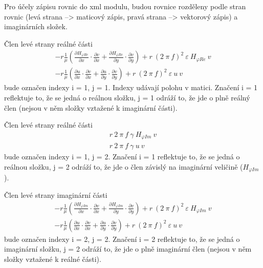 \documentclass[12pt,a4paper,oneside]{article}
\numberwithin{equation}{section} %
\numberwithin{figure}{section} %
\numberwithin{table}{section} %
\begin{document}
Pro účely zápisu rovnic do xml modulu, budou rovnice rozděleny podle stran rovnic (levá strana --> maticový zápis, pravá strana --> vektorový zápis) a imaginárních složek.

Člen levé strany reálné části
\begin{subequations}
\begin{gather}
- r \frac{1}{\mu} \left( \frac{\partial H _{\varphi Re}}{\partial x} \cdot \frac{\partial v}{\partial x} + \frac{\partial H _{\varphi Re}}{\partial y} \cdot \frac{\partial v}{\partial y} \right) + r ~ (2 ~ \pi ~ f) ^2 ~ \varepsilon ~ H _{\varphi Re} ~ v
\\
- r \frac{1}{\mu} \left( \frac{\partial u}{\partial x} \cdot \frac{\partial v}{\partial x} + \frac{\partial u}{\partial y} \cdot \frac{\partial v}{\partial y} \right) + r ~ (2 ~ \pi ~ f) ^2  ~ \varepsilon ~ u ~ v
\end{gather}
\end{subequations}
bude označen indexy i = 1, j = 1. Indexy udávají polohu v matici. Značení i = 1 reflektuje to, že se jedná o reálnou složku, j = 1 odráží to, že jde o plně reálný člen (nejsou v něm složky vztažené k imaginární části). 

Člen levé strany reálné části
\begin{subequations}
\begin{gather}
r ~ 2 ~ \pi ~ f ~ \gamma ~ H _{\varphi Im} ~ v
\\
r ~ 2 ~ \pi ~ f ~ \gamma ~ u ~ v
\end{gather}
\end{subequations}
bude označen indexy i = 1, j = 2. Značení i = 1 reflektuje to, že se jedná o reálnou složku, j = 2 odráží to, že jde o člen závislý na imaginární veličině ($H _{\varphi Im}$).


Člen levé strany imaginární části
\begin{subequations}
\begin{gather}
- r \frac{1}{\mu} \left( \frac{\partial H _{\varphi Im}}{\partial x} \cdot \frac{\partial v}{\partial x} + \frac{\partial H _{\varphi Im}}{\partial y} \cdot \frac{\partial v}{\partial y} \right) + r ~ (2 ~ \pi ~ f) ^2 ~ \varepsilon ~ H _{\varphi Im} ~ v
\\
- r \frac{1}{\mu} \left( \frac{\partial u}{\partial x} \cdot \frac{\partial v}{\partial x} + \frac{\partial u}{\partial y} \cdot \frac{\partial v}{\partial y} \right) + r ~ (2 ~ \pi ~ f) ^2 ~ \varepsilon ~ u ~ v
\end{gather}
\end{subequations}
bude označen indexy i = 2, j = 2. Značení i = 2 reflektuje to, že se jedná o imaginární složku, j = 2 odráží to, že jde o plně imaginární člen (nejsou v něm složky vztažené k reálné části). 
\end{document}
